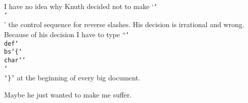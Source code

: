 \def\bs{\char`\\}
\def\pl{\char`\{}
\def\pr{\char`\}}
I have no idea why Knuth decided not to make `{\tt\bs\bs}'
the control sequence for reverse slashes.
His decision is irrational and wrong.
Because of his decision I have to type
``{\tt{\bs}def{\bs}bs\pl{\bs}char`\bs\bs\pr}'' at the beginning of every big
document.

Maybe he just wanted to make me suffer.
\bye
